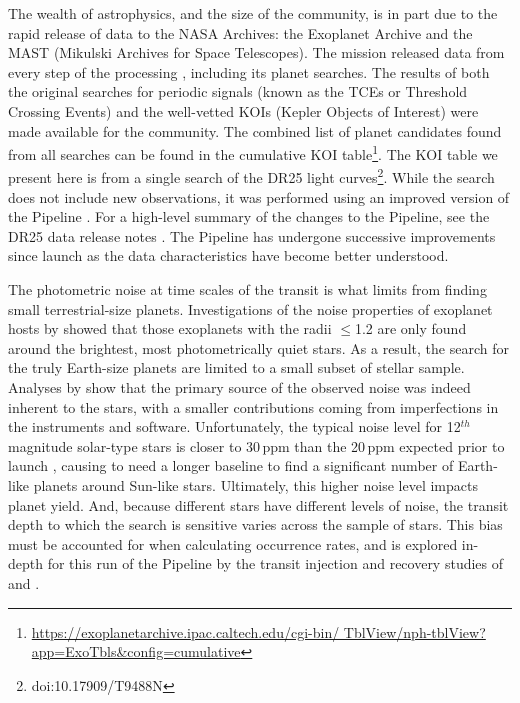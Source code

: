 The wealth of astrophysics, and the size of the \Kepler{} community, is in part due to the rapid release of \Kepler{} data to the NASA Archives: the Exoplanet Archive \citep[][]{Akeson2013} and the MAST (Mikulski Archives for Space Telescopes).  The \Kepler{} mission released data from every step of the processing \citep{Thompson2016KAM,Stumpe2014,Bryson2010b}, including its planet searches. The results of both the original searches for periodic signals (known as the TCEs or Threshold Crossing Events) and the well-vetted KOIs (Kepler Objects of Interest) were made available for the community. The combined list of  planet candidates found from all searches can be found in the cumulative KOI table\footnote{\url{https://exoplanetarchive.ipac.caltech.edu/cgi-bin/ TblView/nph-tblView?app=ExoTbls\&config=cumulative}}.  The KOI table we present here is from a single search of the DR25 light curves\footnote{doi:10.17909/T9488N}. While the search does not include new observations, it was performed using an improved version of the \Kepler{} Pipeline \citep[version 9.3,][]{Jenkins2017}. For a high-level summary of the changes to the \Kepler{} Pipeline, see the DR25 data release notes \citep{DRN25,KDCH}. The \Kepler{} Pipeline has undergone successive improvements since launch as the data characteristics have become better understood.

The photometric noise at time scales of the transit is what limits \Kepler{} from finding small terrestrial-size planets. Investigations of the noise properties of \Kepler{} exoplanet hosts by \citet{Howell2016} showed that those exoplanets  with the radii $\leq$1.2\re{} are only found around the brightest, most photometrically quiet stars. As a result, the search for the truly Earth-size planets are limited to a small subset of  stellar sample.  Analyses by \citet{Gilliland2011,Gilliland2015} show that the primary source of the observed noise was indeed inherent to the stars, with a smaller contributions coming from imperfections in the instruments and software. Unfortunately, the typical noise level for 12$^{th}$ magnitude solar-type stars is closer to 30\,ppm \citep{Gilliland2015} than the 20\,ppm expected prior to launch \citep{Jenkins2002a}, causing \Kepler{} to need a longer baseline to find a significant number of Earth-like planets around Sun-like stars.   Ultimately, this higher noise level impacts  planet yield. And, because different stars have different levels of noise, the transit depth to which the search is sensitive varies across the sample of stars. This bias must be accounted for when calculating occurrence rates, and is explored in-depth for this run of the \Kepler{} Pipeline by the transit injection and recovery studies of \citet[][]{Burke2017b,Burke2017a} and \citet{Christiansen2017}.
 

